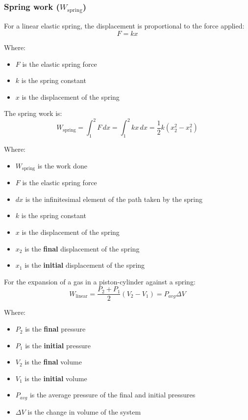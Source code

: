 \documentclass[11pt]{article}
\begin{document}
\newpage

\subsubsection{Spring work (\(W_{\text{spring}}\))}
\label{sec:orgd1e069f}
For a linear elastic spring, the displacement is proportional to the force applied:
\[F = kx\]

Where:
\begin{itemize}
\item \(F\) is the elastic spring force
\item \(k\) is the spring constant
\item \(x\) is the displacement of the spring
\end{itemize}

The spring work is:
\[W_{\text{spring}} = \int_1^2 F \, dx = \int_1^2 kx \, dx = \frac{1}{2}k \left(x_2^2 - x_1^2 \right)\]

Where:
\begin{itemize}
\item \(W_{\text{spring}}\) is the work done
\item \(F\) is the elastic spring force
\item \(dx\) is the infinitesimal element of the path taken by the spring
\item \(k\) is the spring constant
\item \(x\) is the displacement of the spring
\item \(x_2\) is the \textbf{final} displacement of the spring
\item \(x_1\) is the \textbf{initial} displacement of the spring
\end{itemize}

For the expansion of a gas in a piston-cylinder against a spring:
\[W_{\text{linear}} = \frac{P_2 + P_1}{2} \left(V_2 - V_1 \right) = P_{avg} \Delta V\]

Where:
\begin{itemize}
\item \(P_2\) is the \textbf{final} pressure
\item \(P_1\) is the \textbf{initial} pressure
\item \(V_2\) is the \textbf{final} volume
\item \(V_1\) is the \textbf{initial} volume
\item \(P_{avg}\) is the average pressure of the final and initial pressures
\item \(\Delta V\) is the change in volume of the system
\end{itemize}
\end{document}
